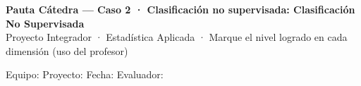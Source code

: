 \documentclass[11pt,letterpaper]{article}
\begin{document}
\begin{center}
{\large \textbf{Pauta Cátedra --- Caso 2 · Clasificación no supervisada: Clasificación No Supervisada}}\\[0.1cm]
{\footnotesize Proyecto Integrador · Estadística Aplicada · Marque el nivel logrado en cada dimensión (uso del profesor)}
\end{center}
\vspace{0.05cm}
{\small Equipo: \underline{\hspace{5cm}}\quad Proyecto: \underline{\hspace{5.5cm}}\quad Fecha: \underline{\hspace{2.6cm}}\quad Evaluador: \underline{\hspace{3.5cm}}}
\vspace{0.15cm}

\footnotesize\renewcommand{\arraystretch}{1.15}
\end{document}
